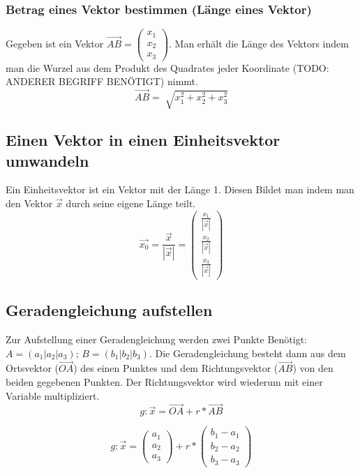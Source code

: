 \documentclass{article}
\begin{document}
\subsubsection{Betrag eines Vektor bestimmen (Länge eines Vektor)} \label{BetragVektor}
Gegeben ist ein Vektor $\vec{AB} = \begin{pmatrix} x_1 \\ x_2 \\ x_3 \end{pmatrix}$. Man erhält die Länge des Vektors indem man die Wurzel aus dem Produkt des Quadrates jeder Koordinate (TODO: ANDERER BEGRIFF BENÖTIGT) nimmt.
\begin{equation}
\vec{AB} = \sqrt[]{x_1^2 + x_2^2 + x_3^2}
\end{equation}

\subsection{Einen Vektor in einen Einheitsvektor umwandeln} \label{Einheitsvektor}
Ein Einheitsvektor ist ein Vektor mit der Länge 1. Diesen Bildet man indem man den Vektor $\vec{x}$ durch seine eigene Länge teilt.
\begin{equation}
\vec{x_0} = \frac{\vec{x}}{ | \vec{x} | } = \begin{pmatrix}
\frac{x_1}{ | \vec{x} | } \\
\frac{x_2}{ | \vec{x} | } \\
\frac{x_3}{ | \vec{x} | }
\end{pmatrix}
\end{equation}

\subsection{Geradengleichung aufstellen}
Zur Aufstellung einer Geradengleichung werden zwei Punkte Benötigt: $A = (a_1 | a_2 | a_3)$; $B = (b_1 | b_2 | b_3)$. Die Geradengleichung besteht dann aus dem Ortsvektor ($\vec{OA}$) des einen Punktes und dem Richtungsvektor ($\vec{AB}$) von den beiden gegebenen Punkten. Der Richtungsvektor wird wiederum mit einer Variable multipliziert.
\begin{equation}
g : \vec{x} = \vec{OA} + r * \vec{AB}
\end{equation}

\begin{equation}
g : \vec{x} = \begin{pmatrix} a_1 \\ a_2 \\ a_3 \end{pmatrix} + r * \begin{pmatrix} b_1 - a_1 \\ b_2 - a_2 \\ b_3 - a_3 \end{pmatrix}
\end{equation}
\end{document}
